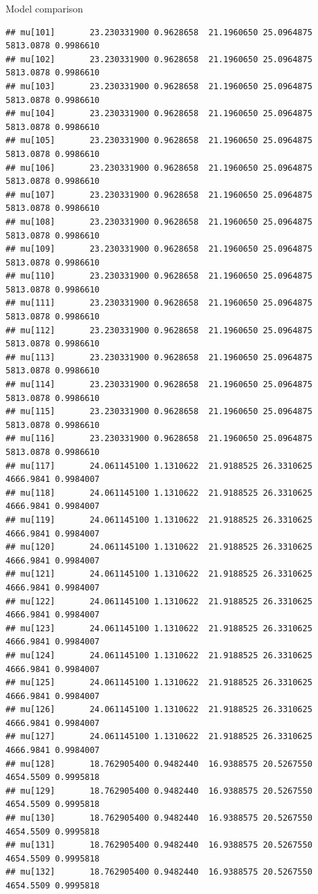 \documentclass[
  ignorenonframetext,
]{beamer}
\begin{document}
\begin{frame}[fragile]{Model comparison}
\begin{verbatim}
## mu[101]       23.230331900 0.9628658  21.1960650 25.0964875 5813.0878 0.9986610
## mu[102]       23.230331900 0.9628658  21.1960650 25.0964875 5813.0878 0.9986610
## mu[103]       23.230331900 0.9628658  21.1960650 25.0964875 5813.0878 0.9986610
## mu[104]       23.230331900 0.9628658  21.1960650 25.0964875 5813.0878 0.9986610
## mu[105]       23.230331900 0.9628658  21.1960650 25.0964875 5813.0878 0.9986610
## mu[106]       23.230331900 0.9628658  21.1960650 25.0964875 5813.0878 0.9986610
## mu[107]       23.230331900 0.9628658  21.1960650 25.0964875 5813.0878 0.9986610
## mu[108]       23.230331900 0.9628658  21.1960650 25.0964875 5813.0878 0.9986610
## mu[109]       23.230331900 0.9628658  21.1960650 25.0964875 5813.0878 0.9986610
## mu[110]       23.230331900 0.9628658  21.1960650 25.0964875 5813.0878 0.9986610
## mu[111]       23.230331900 0.9628658  21.1960650 25.0964875 5813.0878 0.9986610
## mu[112]       23.230331900 0.9628658  21.1960650 25.0964875 5813.0878 0.9986610
## mu[113]       23.230331900 0.9628658  21.1960650 25.0964875 5813.0878 0.9986610
## mu[114]       23.230331900 0.9628658  21.1960650 25.0964875 5813.0878 0.9986610
## mu[115]       23.230331900 0.9628658  21.1960650 25.0964875 5813.0878 0.9986610
## mu[116]       23.230331900 0.9628658  21.1960650 25.0964875 5813.0878 0.9986610
## mu[117]       24.061145100 1.1310622  21.9188525 26.3310625 4666.9841 0.9984007
## mu[118]       24.061145100 1.1310622  21.9188525 26.3310625 4666.9841 0.9984007
## mu[119]       24.061145100 1.1310622  21.9188525 26.3310625 4666.9841 0.9984007
## mu[120]       24.061145100 1.1310622  21.9188525 26.3310625 4666.9841 0.9984007
## mu[121]       24.061145100 1.1310622  21.9188525 26.3310625 4666.9841 0.9984007
## mu[122]       24.061145100 1.1310622  21.9188525 26.3310625 4666.9841 0.9984007
## mu[123]       24.061145100 1.1310622  21.9188525 26.3310625 4666.9841 0.9984007
## mu[124]       24.061145100 1.1310622  21.9188525 26.3310625 4666.9841 0.9984007
## mu[125]       24.061145100 1.1310622  21.9188525 26.3310625 4666.9841 0.9984007
## mu[126]       24.061145100 1.1310622  21.9188525 26.3310625 4666.9841 0.9984007
## mu[127]       24.061145100 1.1310622  21.9188525 26.3310625 4666.9841 0.9984007
## mu[128]       18.762905400 0.9482440  16.9388575 20.5267550 4654.5509 0.9995818
## mu[129]       18.762905400 0.9482440  16.9388575 20.5267550 4654.5509 0.9995818
## mu[130]       18.762905400 0.9482440  16.9388575 20.5267550 4654.5509 0.9995818
## mu[131]       18.762905400 0.9482440  16.9388575 20.5267550 4654.5509 0.9995818
## mu[132]       18.762905400 0.9482440  16.9388575 20.5267550 4654.5509 0.9995818

\end{verbatim}
\end{frame}
\end{document}
